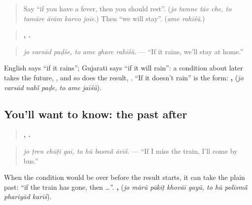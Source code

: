 \label{lesson:GU-C283-jo-varsad-padshe}



\begin{quote}
Say \textquotedblleft{}if you have a fever, then you should rest\textquotedblright{}. (\emph{jo tamne tāv che, to tamāre ārām karvo joīe}.) Then \textquotedblleft{}we will stay\textquotedblright{}. (\emph{ame rahīśũ}.)
\end{quote}

\begin{grammarlens}[title={Grammar Lens: the future after \gu{જો}}]
\begin{quote}
\textbf{  ,    .}
\end{quote}

\begin{quote}
\emph{jo varsād paḍśe, to ame ghare rahīśũ.} — \textquotedblleft{}If it rains, we'll stay at home.\textquotedblright{}
\end{quote}

English says \textquotedblleft{}if it rains\textquotedblright{}; Gujarati says \textquotedblleft{}if it will rain\textquotedblright{}: a condition about later takes the future, \textbf{}, and so does the result, \textbf{}. \textquotedblleft{}If it doesn't rain\textquotedblright{} is the \textbf{} form: \textbf{   ,   } (\emph{jo varsād nahī̃ paḍe, to ame jaīśũ}).
\end{grammarlens}

\subsection*{You'll want to know: the past after }
\begin{quote}
\textbf{   ,    .}
\end{quote}

\begin{quote}
\emph{jo ṭren chūṭī gaī, to hũ basmā̃ āvīś.} — \textquotedblleft{}If I miss the train, I'll come by bus.\textquotedblright{}
\end{quote}

When the condition would be over before the result starts, it can take the plain past: \textquotedblleft{}if the train has gone, then …\textquotedblright{}. \textbf{    ,     } (\emph{jo mārũ pākīṭ khovāī gayũ, to hũ polīsmā̃ phariyād karīś}).

